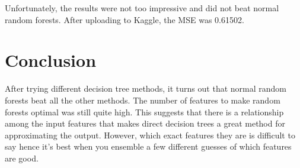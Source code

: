 \documentclass[twoside,11pt]{article}
\theoremstyle{definition}
\begin{document}
Unfortunately, the results were not too impressive and did not beat normal random forests. After uploading to Kaggle, the MSE was 0.61502. 

\newpage

\section*{Conclusion}

After trying different decision tree methods, it turns out that normal random forests beat all the other methods. The number of features to make random forests optimal was still quite high. This suggests that there is a relationship among the input features that makes direct decision trees a great method for approximating the output. However, which exact features they are is difficult to say hence it's best when you ensemble a few different guesses of which features are good. 
\end{document}
